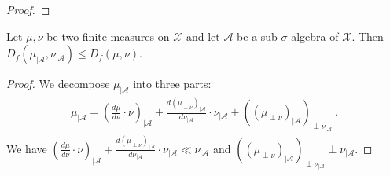\begin{proof}\leanok
\end{proof}

\begin{theorem}
  \label{thm:fDiv_trim_le}
  \leanok
  Let $\mu, \nu$ be two finite measures on $\mathcal X$ and let $\mathcal A$ be a sub-$\sigma$-algebra of $\mathcal X$. Then
  $D_f(\mu_{| \mathcal A}, \nu_{| \mathcal A}) \le D_f(\mu, \nu)$.
\end{theorem}

\begin{proof}\leanok
{}
We decompose $\mu_{| \mathcal A}$ into three parts:
\begin{align*}
\mu_{| \mathcal A}
= (\frac{d\mu}{d\nu}\cdot \nu)_{| \mathcal A}
  + \frac{d (\mu_{\perp \nu})_{| \mathcal A}}{d \nu_{| \mathcal A}} \cdot \nu_{| \mathcal A}
  + ((\mu_{\perp \nu})_{| \mathcal A})_{\perp \nu_{| \mathcal A}}
\: . 
\end{align*}
We have $(\frac{d\mu}{d\nu}\cdot \nu)_{| \mathcal A} + \frac{d (\mu_{\perp \nu})_{| \mathcal A}}{d \nu_{| \mathcal A}} \cdot \nu_{| \mathcal A} \ll \nu_{| \mathcal A}$ and $((\mu_{\perp \nu})_{| \mathcal A})_{\perp \nu_{| \mathcal A}} \perp \nu_{| \mathcal A}$.


\end{proof}
